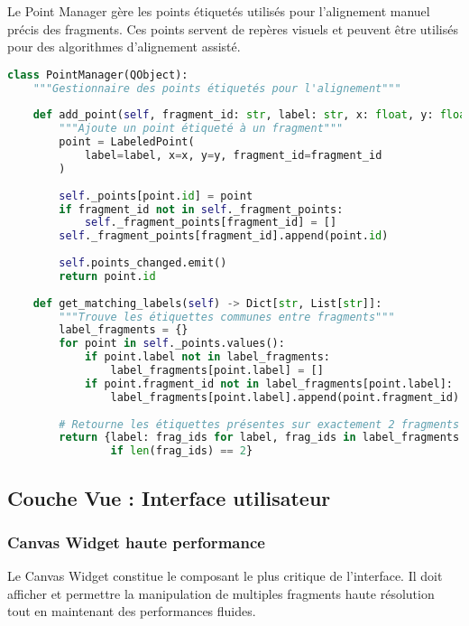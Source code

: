 \documentclass[12pt,a4paper]{report}
\begin{document}
Le Point Manager gère les points étiquetés utilisés pour l'alignement manuel précis des fragments. Ces points servent de repères visuels et peuvent être utilisés pour des algorithmes d'alignement assisté.

\begin{lstlisting}[language=Python, caption=Gestion des points étiquetés]
class PointManager(QObject):
    """Gestionnaire des points étiquetés pour l'alignement"""
    
    def add_point(self, fragment_id: str, label: str, x: float, y: float) -> str:
        """Ajoute un point étiqueté à un fragment"""
        point = LabeledPoint(
            label=label, x=x, y=y, fragment_id=fragment_id
        )
        
        self._points[point.id] = point
        if fragment_id not in self._fragment_points:
            self._fragment_points[fragment_id] = []
        self._fragment_points[fragment_id].append(point.id)
        
        self.points_changed.emit()
        return point.id
    
    def get_matching_labels(self) -> Dict[str, List[str]]:
        """Trouve les étiquettes communes entre fragments"""
        label_fragments = {}
        for point in self._points.values():
            if point.label not in label_fragments:
                label_fragments[point.label] = []
            if point.fragment_id not in label_fragments[point.label]:
                label_fragments[point.label].append(point.fragment_id)
        
        # Retourne les étiquettes présentes sur exactement 2 fragments
        return {label: frag_ids for label, frag_ids in label_fragments.items() 
                if len(frag_ids) == 2}
\end{lstlisting}

\subsection{Couche Vue : Interface utilisateur}

\subsubsection{Canvas Widget haute performance}

Le Canvas Widget constitue le composant le plus critique de l'interface. Il doit afficher et permettre la manipulation de multiples fragments haute résolution tout en maintenant des performances fluides.
\end{document}
